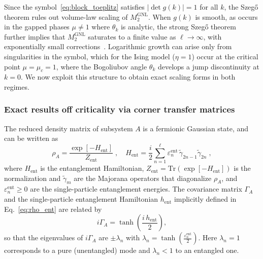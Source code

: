 \documentclass[prx,twocolumn,superscriptaddress,aps,10pt, frontmatterverbose, reprint,footinbib,longbibliography=true]{revtex4-2}
\begin{document}
Since the symbol~\eqref{eq:block_toeplitz} satisfies $|\det g(k)| = 1$ for all $k$, the Szeg\H{o} theorem rules out volume-law scaling of $M_2^{\mathrm{GNL}}$.
When $g(k)$ is smooth, as occurs in the gapped phases $\mu \neq 1$ where $\theta_k$ is analytic, the strong Szeg\H{o} theorem further implies that $M_2^{\mathrm{GNL}}$ saturates to a finite value as $\ell \to \infty$, with exponentially small corrections~\cite{simon2010szego}.
Logarithmic growth can arise only from singularities in the symbol, which for the Ising model ($\eta=1$) occur at the critical point $\mu = \mu_c = 1$, where the Bogoliubov angle $\theta_k$ develops a jump discontinuity at $k = 0$.
We now exploit this structure to obtain exact scaling forms in both regimes.

\subsubsection{Exact results off criticality via corner transfer matrices}
The reduced density matrix of subsystem $A$ is a fermionic Gaussian state, and can be written as~\cite{Peschel2004}
\begin{equation}
    \rho_A = \frac{\exp[{-H_{\mathrm{ent}}}]}{Z_{\mathrm{ent}}}\;, \quad H_{\mathrm{ent}} = \frac{i}{2}\sum_{n=1}^{\ell} \varepsilon_n^{\mathrm{ent}}\,\tilde\gamma_{2n-1}\tilde\gamma_{2n}\;,
    \label{eq:rho_ent}
\end{equation}
where $H_{\mathrm{ent}}$ is the entanglement Hamiltonian, $Z_{\mathrm{ent}}=\mathrm{Tr}(\exp[{-H_{\mathrm{ent}}}])$ is the normalization and $\tilde\gamma_m$ are the Majorana operators that diagonalize $\rho_A$, and $\varepsilon_n^{\mathrm{ent}} \geq 0$ are the single-particle entanglement energies.
The covariance matrix $\Gamma_A$ and the single-particle entanglement Hamiltonian $h_{\mathrm{ent}}$ implicitly defined in Eq.~\eqref{eq:rho_ent} are related by
\begin{equation}
    i\Gamma_A = \tanh\!\left(\frac{i\,h_{\mathrm{ent}}}{2}\right),
    \label{eq:Gamma_tanh}
\end{equation}
so that the eigenvalues of $i\Gamma_A$ are $\pm\lambda_n$ with $\lambda_n = \tanh\!\left(\frac{\varepsilon_n^{\mathrm{ent}}}{2}\right)$. 
Here $\lambda_n = 1$ corresponds to a pure (unentangled) mode and $\lambda_n < 1$ to an entangled one.
\end{document}
